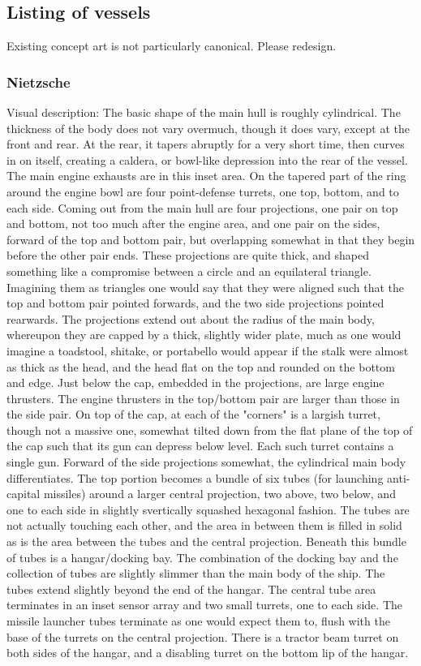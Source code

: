 \subsection{Listing of vessels}

Existing concept art is not particularly canonical. Please redesign.

\subsubsection{Nietzsche}

Visual description: 
The basic shape of the main hull is roughly cylindrical. The thickness of the body does not vary overmuch, though it does vary, except at the front and rear. At the rear, it tapers abruptly for a very short time, then curves in on itself, creating a caldera, or bowl-like depression into the rear of the vessel. The main engine exhausts are in this inset area. On the tapered part of the ring around the engine bowl are four point-defense turrets, one top, bottom, and to each side. Coming out from the main hull are four projections, one pair on top and bottom, not too much after the engine area, and one pair on the sides, forward of the top and bottom pair, but overlapping somewhat in that they begin before the other pair ends. These projections are quite thick, and shaped something like a compromise between a circle and an equilateral triangle. Imagining them as triangles one would say that they were aligned such that the top and bottom pair pointed forwards, and the two side projections pointed rearwards. The projections extend out about the radius of the main body, whereupon they are capped by a thick, slightly wider plate, much as one would imagine a toadstool, shitake, or portabello would appear if the stalk were almost as thick as the head, and the head flat on the top and rounded on the bottom and edge. Just below the cap, embedded in the projections, are large engine thrusters. The engine thrusters in the top/bottom pair are larger than those in the side pair. On top of the cap, at each of the "corners" is a largish turret, though not a massive one, somewhat tilted down from the flat plane of the top of the cap such that its gun can depress below level. Each such turret contains a single gun. Forward of the side projections somewhat, the cylindrical main body differentiates. The top portion becomes a bundle of six tubes (for launching anti-capital missiles) around a larger central projection, two above, two below, and one to each side in slightly svertically squashed hexagonal fashion. The tubes are not actually touching each other, and the area in between them is filled in solid as is the area between the tubes and the central projection. Beneath this bundle of tubes is a hangar/docking bay. The combination of the docking bay and the collection of tubes are slightly slimmer than the main body of the ship. The tubes extend slightly beyond the end of the hangar. The central tube area terminates in an inset sensor array and two small turrets, one to each side. The missile launcher tubes terminate as one would expect them to, flush with the base of the turrets on the central projection. There is a tractor beam turret on both sides of the hangar, and a disabling turret on the bottom lip of the hangar. 

